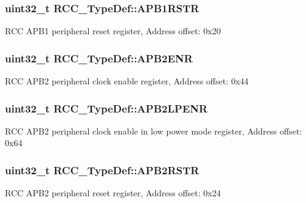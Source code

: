 \subsubsection[{\texorpdfstring{A\+P\+B1\+R\+S\+TR}{APB1RSTR}}]{ uint32\+\_\+t R\+C\+C\+\_\+\+Type\+Def\+::\+A\+P\+B1\+R\+S\+TR}\hypertarget{struct_r_c_c___type_def_a600f4d6d592f43edb2fc653c5cba023a}{}\label{struct_r_c_c___type_def_a600f4d6d592f43edb2fc653c5cba023a}
R\+CC A\+P\+B1 peripheral reset register, Address offset\+: 0x20 
\subsubsection[{\texorpdfstring{A\+P\+B2\+E\+NR}{APB2ENR}}]{ uint32\+\_\+t R\+C\+C\+\_\+\+Type\+Def\+::\+A\+P\+B2\+E\+NR}\hypertarget{struct_r_c_c___type_def_a619b4c22f630a269dfd0c331f90f6868}{}\label{struct_r_c_c___type_def_a619b4c22f630a269dfd0c331f90f6868}
R\+CC A\+P\+B2 peripheral clock enable register, Address offset\+: 0x44 
\subsubsection[{\texorpdfstring{A\+P\+B2\+L\+P\+E\+NR}{APB2LPENR}}]{ uint32\+\_\+t R\+C\+C\+\_\+\+Type\+Def\+::\+A\+P\+B2\+L\+P\+E\+NR}\hypertarget{struct_r_c_c___type_def_a7e46c65220f00a6858a5b35b74a37b51}{}\label{struct_r_c_c___type_def_a7e46c65220f00a6858a5b35b74a37b51}
R\+CC A\+P\+B2 peripheral clock enable in low power mode register, Address offset\+: 0x64 
\subsubsection[{\texorpdfstring{A\+P\+B2\+R\+S\+TR}{APB2RSTR}}]{ uint32\+\_\+t R\+C\+C\+\_\+\+Type\+Def\+::\+A\+P\+B2\+R\+S\+TR}\hypertarget{struct_r_c_c___type_def_a4491ab20a44b70bf7abd247791676a59}{}\label{struct_r_c_c___type_def_a4491ab20a44b70bf7abd247791676a59}
R\+CC A\+P\+B2 peripheral reset register, Address offset\+: 0x24 
